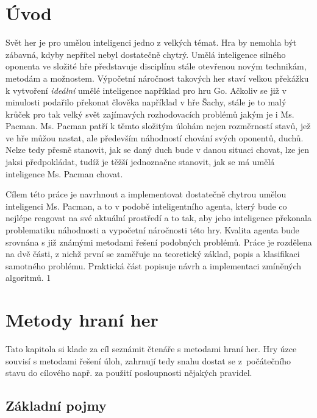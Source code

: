 \chapter{Úvod}
    Svět her je pro umělou inteligenci jedno z velkých témat. Hra by nemohla být zábavná, kdyby nepřítel nebyl dostatečně chytrý. Umělá inteligence silného oponenta ve složité hře představuje disciplínu stále otevřenou novým technikám, metodám a možnostem. Výpočetní náročnost takových her staví velkou překážku k vytvoření \textit{ideální} umělé inteligence například pro hru Go. Ačkoliv se již v minulosti podařilo překonat člověka například v hře Šachy, stále je to malý krůček pro tak velký svět zajímavých rozhodovacích problémů jakým je i Ms. Pacman. Ms. Pacman patří k těmto složitým úlohám nejen rozměrností stavů, jež ve hře můžou nastat, ale především náhodností chování svých oponentů, duchů. Nelze tedy přesně stanovit, jak se daný duch bude v danou situaci chovat, lze jen jaksi předpokládat, tudíž je těžší jednoznačne stanovit, jak se má umělá inteligence Ms. Pacman chovat.

Cílem této práce je navrhnout a implementovat dostatečně chytrou umělou inteligenci Ms. Pacman, a to v podobě inteligentního agenta, který bude co nejlépe reagovat na své aktuální prostředí a to tak, aby jeho inteligence překonala problematiku náhodnosti a vypočetní náročnosti této hry. Kvalita agenta bude srovnána s již známými metodami řešení podobných problémů. Práce je rozdělena na dvě části, z nichž první se zaměřuje na teoretický základ, popis a klasifikaci samotného problému. Praktická část popisuje návrh a implementaci zmíněných algoritmů.
1
\chapter{Metody hraní her}
Tato kapitola si klade za cíl seznámit čtenáře s metodami hraní her. Hry úzce souvisí s metodami řešení úloh, zahrnují tedy snahu dostat se z počátečního stavu do cílového např. za použití posloupnosti nějakých pravidel. 

\section{Základní pojmy}

